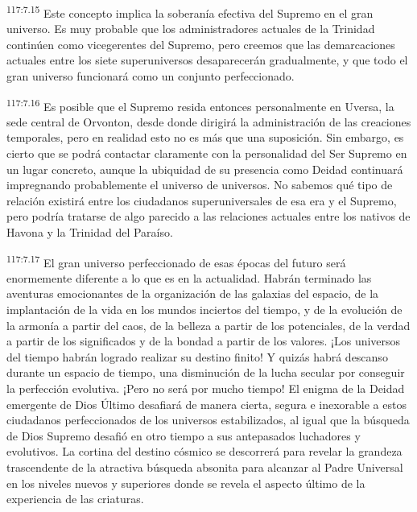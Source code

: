 \documentclass[twoside, 11pt]{book}
\begin{document}
\par
\textsuperscript{117:7.15} Este concepto implica la soberanía efectiva del Supremo en el gran universo. Es muy probable que los administradores actuales de la Trinidad continúen como vicegerentes del Supremo, pero creemos que las demarcaciones actuales entre los siete superuniversos desaparecerán gradualmente, y que todo el gran universo funcionará como un conjunto perfeccionado.

\par
\textsuperscript{117:7.16} Es posible que el Supremo resida entonces personalmente en Uversa, la sede central de Orvonton, desde donde dirigirá la administración de las creaciones temporales, pero en realidad esto no es más que una suposición. Sin embargo, es cierto que se podrá contactar claramente con la personalidad del Ser Supremo en un lugar concreto, aunque la ubiquidad de su presencia como Deidad continuará impregnando probablemente el universo de universos. No sabemos qué tipo de relación existirá entre los ciudadanos superuniversales de esa era y el Supremo, pero podría tratarse de algo parecido a las relaciones actuales entre los nativos de Havona y la Trinidad del Paraíso.

\par
\textsuperscript{117:7.17} El gran universo perfeccionado de esas épocas del futuro será enormemente diferente a lo que es en la actualidad. Habrán terminado las aventuras emocionantes de la organización de las galaxias del espacio, de la implantación de la vida en los mundos inciertos del tiempo, y de la evolución de la armonía a partir del caos, de la belleza a partir de los potenciales, de la verdad a partir de los significados y de la bondad a partir de los valores. ¡Los universos del tiempo habrán logrado realizar su destino finito! Y quizás habrá descanso durante un espacio de tiempo, una disminución de la lucha secular por conseguir la perfección evolutiva. ¡Pero no será por mucho tiempo! El enigma de la Deidad emergente de Dios Último desafiará de manera cierta, segura e inexorable a estos ciudadanos perfeccionados de los universos estabilizados, al igual que la búsqueda de Dios Supremo desafió en otro tiempo a sus antepasados luchadores y evolutivos. La cortina del destino cósmico se descorrerá para revelar la grandeza trascendente de la atractiva búsqueda absonita para alcanzar al Padre Universal en los niveles nuevos y superiores donde se revela el aspecto último de la experiencia de las criaturas.
\end{document}
